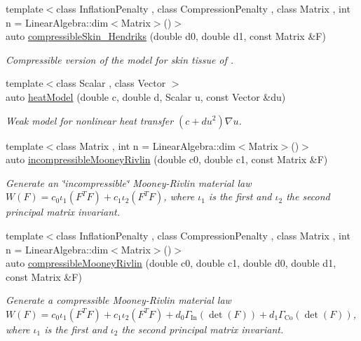\begin{DoxyCompactItemize}
{\footnotesize template$<$class Inflation\-Penalty , class Compression\-Penalty , class Matrix , int n = Linear\-Algebra\-::dim$<$\-Matrix$>$()$>$ }\\auto \hyperlink{group__Biomechanics_ga03684718dd8b87b1370fdf4d6351a066}{compressible\-Skin\-\_\-\-Hendriks} (double d0, double d1, const Matrix \&F)
\begin{DoxyCompactList}\small\item\em Compressible version of the model for skin tissue of \cite{Hendriks2005}. \end{DoxyCompactList}\item 
{\footnotesize template$<$class Scalar , class Vector $>$ }\\auto \hyperlink{namespacefuncy_aa784fe45579db52a36805656559a7afe}{heat\-Model} (double c, double d, Scalar u, const Vector \&du)
\begin{DoxyCompactList}\small\item\em Weak model for nonlinear heat transfer $ (c+du^2)\nabla u $. \end{DoxyCompactList}\item 
{\footnotesize template$<$class Matrix , int n = Linear\-Algebra\-::dim$<$\-Matrix$>$()$>$ }\\auto \hyperlink{group__Rubber_gacbf67f93c8dc330013448669410822f3}{incompressible\-Mooney\-Rivlin} (double c0, double c1, const Matrix \&F)
\begin{DoxyCompactList}\small\item\em Generate an \char`\"{}incompressible\char`\"{} Mooney-\/\-Rivlin material law $ W(F)=c_0\iota_1(F^T F) + c_1\iota_2(F^T F) $, where $\iota_1$ is the first and $\iota_2$ the second principal matrix invariant. \end{DoxyCompactList}\item 
{\footnotesize template$<$class Inflation\-Penalty , class Compression\-Penalty , class Matrix , int n = Linear\-Algebra\-::dim$<$\-Matrix$>$()$>$ }\\auto \hyperlink{group__Rubber_ga335b92acb5e3b72e760fe5a3d536e276}{compressible\-Mooney\-Rivlin} (double c0, double c1, double d0, double d1, const Matrix \&F)
\begin{DoxyCompactList}\small\item\em Generate a compressible Mooney-\/\-Rivlin material law $ W(F)=c_0\iota_1(F^T F) + c_1\iota_2(F^T F) + d_0\Gamma_\mathrm{In}(\det(F))+d_1\Gamma_\mathrm{Co}(\det(F)) $, where $\iota_1$ is the first and $\iota_2$ the second principal matrix invariant. \end{DoxyCompactList}\item 

\end{DoxyCompactItemize}
